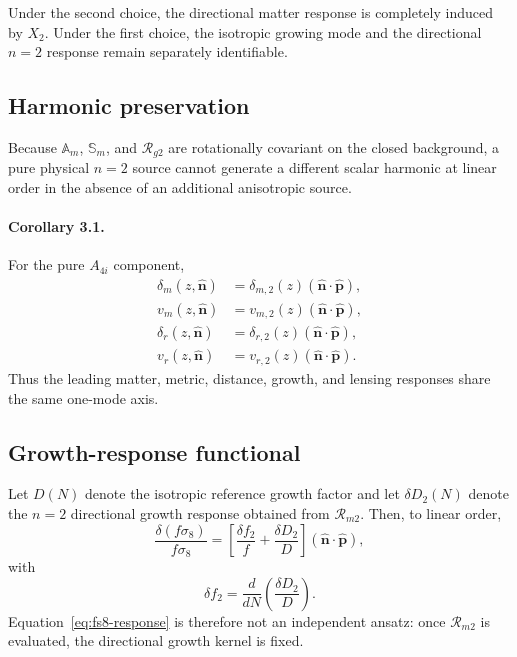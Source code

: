 Under the second choice, the directional matter response is completely
induced by $X_2$.  Under the first choice, the isotropic growing mode and the
directional $n=2$ response remain separately identifiable.

\subsection{Harmonic preservation}

Because $\mathbb A_m$, $\mathbb S_m$, and $\mathcal R_{g2}$ are rotationally
covariant on the closed background, a pure physical $n=2$ source cannot
generate a different scalar harmonic at linear order in the absence of an
additional anisotropic source.

\paragraph{Corollary 3.1.}
For the pure $A_{4i}$ component,
\begin{align}
\delta_m(z,\hat{\mathbf n})
&=
\delta_{m,2}(z)
(\hat{\mathbf n}\!\cdot\!\hat{\mathbf p}),
\\
v_m(z,\hat{\mathbf n})
&=
v_{m,2}(z)
(\hat{\mathbf n}\!\cdot\!\hat{\mathbf p}),
\\
\delta_r(z,\hat{\mathbf n})
&=
\delta_{r,2}(z)
(\hat{\mathbf n}\!\cdot\!\hat{\mathbf p}),
\\
v_r(z,\hat{\mathbf n})
&=
v_{r,2}(z)
(\hat{\mathbf n}\!\cdot\!\hat{\mathbf p}).
\end{align}
Thus the leading matter, metric, distance, growth, and lensing responses share
the same one-mode axis.

\subsection{Growth-response functional}

Let $D(N)$ denote the isotropic reference growth factor and let
$\delta D_2(N)$ denote the $n=2$ directional growth response obtained from
$\mathcal R_{m2}$.  Then, to linear order,
\begin{equation}
\frac{\delta(f\sigma_8)}{f\sigma_8}
=
\left[
\frac{\delta f_2}{f}
+
\frac{\delta D_2}{D}
\right]
(\hat{\mathbf n}\!\cdot\!\hat{\mathbf p}),
\label{eq:fs8-response}
\end{equation}
with
\begin{equation}
\delta f_2
=
\frac{d}{dN}
\left(
\frac{\delta D_2}{D}
\right).
\end{equation}
Equation~\eqref{eq:fs8-response} is therefore not an independent ansatz:
once $\mathcal R_{m2}$ is evaluated, the directional growth kernel is fixed.

